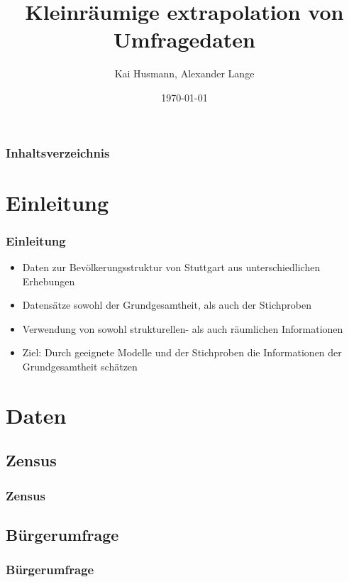 \documentclass{beamer}
\begin{document}


\title{Kleinräumige extrapolation von Umfragedaten}   
\author{Kai Husmann, Alexander Lange} 
\date{\today}

\begin{frame}
\titlepage
\end{frame}

\begin{frame}
\frametitle{Inhaltsverzeichnis}\tableofcontents
\end{frame}


\section{Einleitung}
\begin{frame}\frametitle{Einleitung} 
\begin{itemize}
\item Daten zur Bevölkerungsstruktur von Stuttgart aus unterschiedlichen Erhebungen
\item Datensätze sowohl der Grundgesamtheit, als auch der Stichproben 
\item Verwendung von sowohl strukturellen- als auch räumlichen Informationen
\item Ziel: Durch geeignete Modelle und der Stichproben die Informationen der Grundgesamtheit schätzen 
\end{itemize}
\end{frame}

\section{Daten} 
\subsection{Zensus}
\begin{frame}\frametitle{Zensus}

\end{frame}

\subsection{Bürgerumfrage}
\begin{frame}\frametitle{Bürgerumfrage}

\end{frame}
\end{document}
